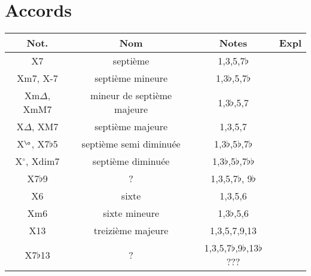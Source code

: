 \documentclass[a4paper,10pt]{article}
\begin{document}
\section{Accords}
\begin{tabular}{ | c | c | c | c | } \hline			
	Not. & Nom & Notes & Expl \\ \hline  
	X7 & septième & 1,3,5,7$\flat$ & \\ \hline
	Xm7, X-7 & septième mineure & 1,3$\flat$,5,7$\flat$ & \\ \hline
	Xm$\Delta$, XmM7 & mineur de septième majeure & 1,3$\flat$,5,7 & \\ \hline
	X$\Delta$, XM7 & septième majeure & 1,3,5,7 & \\ \hline
	X$^{\o}$, X7$\flat$5 & septième semi diminuée & 1,3$\flat$,5$\flat$,7$\flat$ & \\ \hline
	X$^{\circ}$, Xdim7 & septième diminuée & 1,3$\flat$,5$\flat$,7$\flat\flat$ & \\ \hline
	X7$\flat$9 & ? & 1,3,5,7$\flat$, 9$\flat$ & \\ \hline
	X6 & sixte & 1,3,5,6 & \\ \hline
	Xm6 & sixte mineure & 1,3$\flat$,5,6 & \\ \hline
	X13 & treizième majeure & 1,3,5,7,9,13 & \\ \hline
	X7$\flat$13 & ? & 1,3,5,7$\flat$,9$\flat$,13$\flat$ ??? & \\ \hline
\end{tabular}
\end{document}
